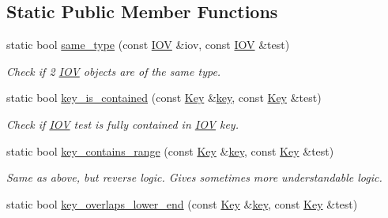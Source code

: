 \subsection*{Static Public Member Functions}
\begin{DoxyCompactItemize}
\item 
static bool \hyperlink{class_d_d4hep_1_1_i_o_v_a25febeab024c770e5846197ca2a6b6fa}{same\+\_\+type} (const \hyperlink{class_d_d4hep_1_1_i_o_v}{I\+OV} \&iov, const \hyperlink{class_d_d4hep_1_1_i_o_v}{I\+OV} \&test)
\begin{DoxyCompactList}\small\item\em Check if 2 \hyperlink{class_d_d4hep_1_1_i_o_v}{I\+OV} objects are of the same type. \end{DoxyCompactList}\item 
static bool \hyperlink{class_d_d4hep_1_1_i_o_v_a43849b67b7823c3acd522bac26cf179d}{key\+\_\+is\+\_\+contained} (const \hyperlink{class_d_d4hep_1_1_i_o_v_a07cb46dc875296dc9cccf4ff370104ae}{Key} \&\hyperlink{class_d_d4hep_1_1_i_o_v_a314b969532607ee37e1f3ac27e4e6f58}{key}, const \hyperlink{class_d_d4hep_1_1_i_o_v_a07cb46dc875296dc9cccf4ff370104ae}{Key} \&test)
\begin{DoxyCompactList}\small\item\em Check if \hyperlink{class_d_d4hep_1_1_i_o_v}{I\+OV} \textquotesingle{}test\textquotesingle{} is fully contained in \hyperlink{class_d_d4hep_1_1_i_o_v}{I\+OV} \textquotesingle{}key\textquotesingle{}. \end{DoxyCompactList}\item 
static bool \hyperlink{class_d_d4hep_1_1_i_o_v_abb985b984cc6eb8576a4f124de7668f5}{key\+\_\+contains\+\_\+range} (const \hyperlink{class_d_d4hep_1_1_i_o_v_a07cb46dc875296dc9cccf4ff370104ae}{Key} \&\hyperlink{class_d_d4hep_1_1_i_o_v_a314b969532607ee37e1f3ac27e4e6f58}{key}, const \hyperlink{class_d_d4hep_1_1_i_o_v_a07cb46dc875296dc9cccf4ff370104ae}{Key} \&test)
\begin{DoxyCompactList}\small\item\em Same as above, but reverse logic. Gives sometimes more understandable logic. \end{DoxyCompactList}\item 
static bool \hyperlink{class_d_d4hep_1_1_i_o_v_a6354b88d28e4e57bd50a02d9d4df7653}{key\+\_\+overlaps\+\_\+lower\+\_\+end} (const \hyperlink{class_d_d4hep_1_1_i_o_v_a07cb46dc875296dc9cccf4ff370104ae}{Key} \&\hyperlink{class_d_d4hep_1_1_i_o_v_a314b969532607ee37e1f3ac27e4e6f58}{key}, const \hyperlink{class_d_d4hep_1_1_i_o_v_a07cb46dc875296dc9cccf4ff370104ae}{Key} \&test)

\end{DoxyCompactItemize}

